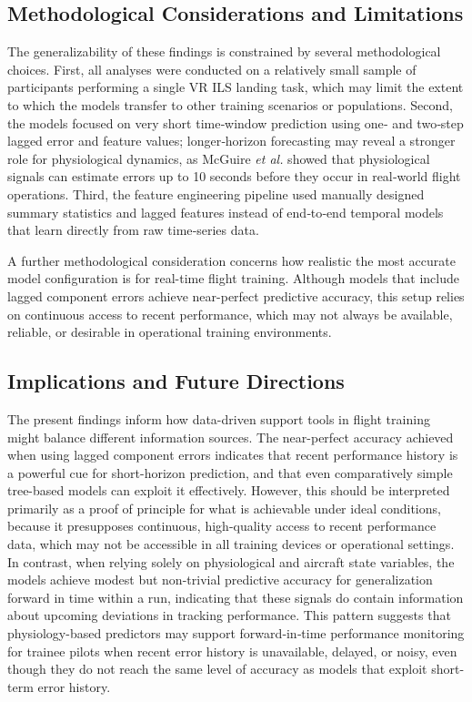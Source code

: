 \documentclass[11pt, a4paper]{article}
\begin{document}
\subsection{Methodological Considerations and Limitations}
The generalizability of these findings is constrained by several methodological choices. First, all analyses were conducted on a relatively small sample of participants performing a single VR ILS landing task, which may limit the extent to which the models transfer to other training scenarios or populations. Second, the models focused on very short time‑window prediction using one‑ and two‑step lagged error and feature values; longer‑horizon forecasting may reveal a stronger role for physiological dynamics, as McGuire \emph{et al.} \cite{mcguire-2026} showed that physiological signals can estimate errors up to 10 seconds before they occur in real‑world flight operations. Third, the feature engineering pipeline used manually designed summary statistics and lagged features instead of end‑to‑end temporal models that learn directly from raw time‑series data. 

A further methodological consideration concerns how realistic the most accurate model configuration is for real-time flight training. Although models that include lagged component errors achieve near-perfect predictive accuracy, this setup relies on continuous access to recent performance, which may not always be available, reliable, or desirable in operational training environments.

\subsection{Implications and Future Directions}
The present findings inform how data-driven support tools in flight training might balance different information sources. The near-perfect accuracy achieved when using lagged component errors indicates that recent performance history is a powerful cue for short-horizon prediction, and that even comparatively simple tree-based models can exploit it effectively. However, this should be interpreted primarily as a proof of principle for what is achievable under ideal conditions, because it presupposes continuous, high-quality access to recent performance data, which may not be accessible  in all training devices or operational settings. In contrast, when relying solely on physiological and aircraft state variables, the models achieve modest but non-trivial predictive accuracy for generalization forward in time within a run, indicating that these signals do contain information about upcoming deviations in tracking performance. This pattern suggests that physiology-based predictors may support forward‑in‑time performance monitoring for trainee pilots when recent error history is unavailable, delayed, or noisy, even though they do not reach the same level of accuracy as models that exploit short-term error history.
\end{document}
